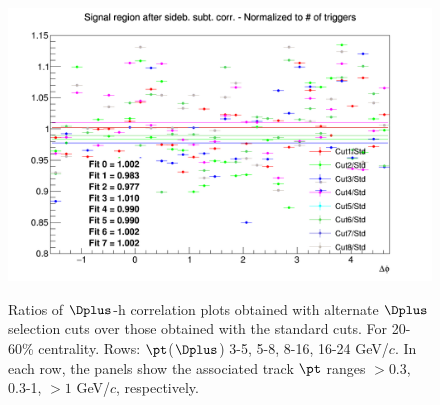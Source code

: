 \begin{figure}
{\includegraphics[width=0.31\linewidth]{Centrality_DPlus/Dplus/Systematic/20_60/Cut/Ratio_AzimCorrDistr_Dplus_Canvas_PtIntBins11to11_PoolInt_thr1dotto99dot.png}} \\
 \caption{Ratios of $\Dplus$-h correlation plots obtained with alternate $\Dplus$ selection cuts over those obtained with the standard cuts. For 20-60\% centrality. Rows: $\pt$($\Dplus$) 3-5, 5-8, 8-16, 16-24 GeV/$c$. In each row, the panels show the associated track
$\pt$ ranges $> 0.3$, 0.3-1, $> 1$ GeV/$c$, respectively.}
\label{fig:SysDcut2060_Dplus}
\end{figure}

